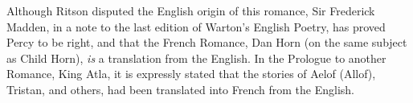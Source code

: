 Although Ritson disputed the English origin of this romance, Sir Frederick
Madden, in a note to the last edition of Warton’s English Poetry, has proved
Percy to be right, and that the French Romance, Dan Horn (on the same subject
as Child Horn), \textit{is} a translation from the English. In the Prologue to another
Romance, King Atla, it is expressly stated that the stories of Aelof (Allof),
Tristan, and others, had been translated into French from the English.
\pagebreak
